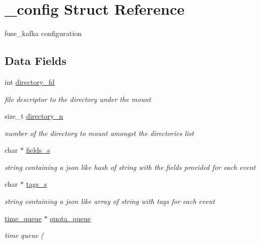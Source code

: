 \hypertarget{struct__config}{\section{\-\_\-config \-Struct \-Reference}
\label{struct__config}
}


fuse\-\_\-kafka configuration  


\subsection*{\-Data \-Fields}
\begin{DoxyCompactItemize}
\item 
\hypertarget{struct__config_a01ffc24a715f72975a6b72af990e72fa}{int \hyperlink{struct__config_a01ffc24a715f72975a6b72af990e72fa}{directory\-\_\-fd}}\label{struct__config_a01ffc24a715f72975a6b72af990e72fa}

\begin{DoxyCompactList}\small\item\em file descriptor to the directory under the mount \end{DoxyCompactList}\item 
\hypertarget{struct__config_a0b3e811f6c5e7037b3763da5d1b9b8d2}{size\-\_\-t \hyperlink{struct__config_a0b3e811f6c5e7037b3763da5d1b9b8d2}{directory\-\_\-n}}\label{struct__config_a0b3e811f6c5e7037b3763da5d1b9b8d2}

\begin{DoxyCompactList}\small\item\em number of the directory to mount amongst the directories list \end{DoxyCompactList}\item 
\hypertarget{struct__config_a1aba07f207e5a58583f1e0a9ac674454}{char $\ast$ \hyperlink{struct__config_a1aba07f207e5a58583f1e0a9ac674454}{fields\-\_\-s}}\label{struct__config_a1aba07f207e5a58583f1e0a9ac674454}

\begin{DoxyCompactList}\small\item\em string containing a json like hash of string with the fields provided for each event \end{DoxyCompactList}\item 
\hypertarget{struct__config_a863b76129d6ac5e58f319afef6960bad}{char $\ast$ \hyperlink{struct__config_a863b76129d6ac5e58f319afef6960bad}{tags\-\_\-s}}\label{struct__config_a863b76129d6ac5e58f319afef6960bad}

\begin{DoxyCompactList}\small\item\em string containing a json like array of string with tags for each event \end{DoxyCompactList}\item 
\hyperlink{structtime__queue}{time\-\_\-queue} $\ast$ \hyperlink{struct__config_a145aaea5a1685bb59a5187bb4f2c5829}{quota\-\_\-queue}
\begin{DoxyCompactList}\small\item\em time queue ( \end{DoxyCompactList}\end{DoxyCompactItemize}


